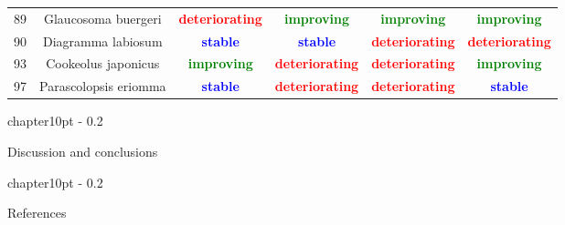 \documentclass{report}\usepackage[]{graphicx}\usepackage[]{color}
\makeatletter
\renewcommand\chapter{\@startsection%
{chapter}{1}{0pt}%
{-\baselineskip}%
{0.2\baselineskip}%
{\raggedright\bf}}%
\makeatother
\begin{document}
\begin{table}[ht]
{\begin{tabular}{cccccc}
   89 & Glaucosoma buergeri & \textcolor{red}{\textbf{deteriorating}} & \textcolor{green}{\textbf{improving}} & \textcolor{green}{\textbf{improving}} & \textcolor{green}{\textbf{improving}} \\ 
   90 & Diagramma labiosum & \textcolor{blue}{\textbf{stable}} & \textcolor{blue}{\textbf{stable}} & \textcolor{red}{\textbf{deteriorating}} & \textcolor{red}{\textbf{deteriorating}} \\ 
   93 & Cookeolus japonicus & \textcolor{green}{\textbf{improving}} & \textcolor{red}{\textbf{deteriorating}} & \textcolor{red}{\textbf{deteriorating}} & \textcolor{green}{\textbf{improving}} \\ 
   97 & Parascolopsis eriomma & \textcolor{blue}{\textbf{stable}} & \textcolor{red}{\textbf{deteriorating}} & \textcolor{red}{\textbf{deteriorating}} & \textcolor{blue}{\textbf{stable}} \\ 
   \hline
\end{tabular}
}
\end{table}

\clearpage
\newpage

\chapter{Discussion and conclusions}


\newpage

\chapter{References}

\end{document}
